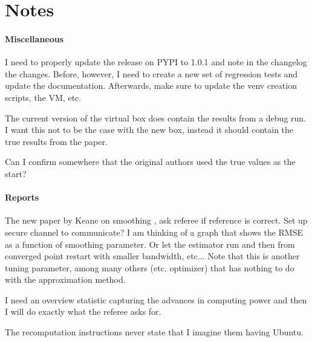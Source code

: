 \section{Notes}


\paragraph{Miscellaneous}

\begin{boenumerate}
\item I need to properly update the release on PYPI to 1.0.1 and note in the changelog the changes. Before, however, I need to create a new set of regression tests and update the documentation.  Afterwards, make sure to update the venv creation scripts, the VM, etc.
\item The current version of the virtual box does contain the results from a debug run. I want this not to be the case with the new box, instead it should contain the true results from the paper.
\item Can I confirm somewhere that the original authors used the true values as the start?
\end{boenumerate}

\paragraph{Reports}

\begin{boenumerate}

\item The new paper by Keane on smoothing \citep{Bruins.2015}, ask referee if reference is correct. Set up secure channel to communicate? I am thinking of a graph that shows the RMSE as a function of smoothing parameter. Or let the estimator run and then from converged point restart with smaller bandwidth, etc... Note that this is another tuning parameter, among many others (etc. optimizer) that has nothing to do with the approximation method.
\item I need an overview statistic capturing the advances in computing power and then I will do exactly what the referee asks for.
\item The recomputation instructions never state that I imagine them having Ubuntu.
\end{boenumerate}
